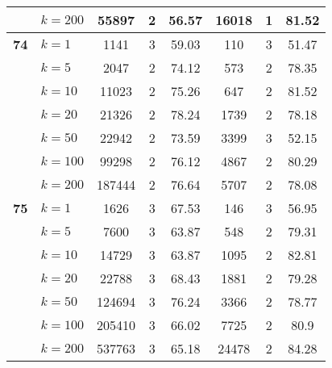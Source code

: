 \begin{table}[htbp]
\begin{tabular}{|l|l|c|c|c|c|c|c|}
     & $k=200$ & 55897 & 2 & 56.57 & 16018 & 1 & 81.52 \\ \hline
    \multicolumn{1}{|r|}{\textbf{74}} & $k=1$ & 1141 & 3 & 59.03 & 110 & 3 & 51.47 \\ 
     & $k=5$ & 2047 & 2 & 74.12 & 573 & 2 & 78.35 \\ 
     & $k=10$ & 11023 & 2 & 75.26 & 647 & 2 & 81.52 \\ 
     & $k=20$ & 21326 & 2 & 78.24 & 1739 & 2 & 78.18 \\ 
     & $k=50$ & 22942 & 2 & 73.59 & 3399 & 3 & 52.15 \\ 
     & $k=100$ & 99298 & 2 & 76.12 & 4867 & 2 & 80.29 \\ 
     & $k=200$ & 187444 & 2 & 76.64 & 5707 & 2 & 78.08 \\ \hline
    \multicolumn{1}{|r|}{\textbf{75}} & $k=1$ & 1626 & 3 & 67.53 & 146 & 3 & 56.95 \\ 
     & $k=5$ & 7600 & 3 & 63.87 & 548 & 2 & 79.31 \\ 
     & $k=10$ & 14729 & 3 & 63.87 & 1095 & 2 & 82.81 \\ 
     & $k=20$ & 22788 & 3 & 68.43 & 1881 & 2 & 79.28 \\ 
     & $k=50$ & 124694 & 3 & 76.24 & 3366 & 2 & 78.77 \\ 
     & $k=100$ & 205410 & 3 & 66.02 & 7725 & 2 & 80.9 \\ 
     & $k=200$ & 537763 & 3 & 65.18 & 24478 & 2 & 84.28 \\ \hline
    \end{tabular}
\end{table}
